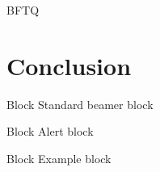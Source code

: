 \documentclass[french]{beamer}
\begin{document}
    \begin{frame}

        BFTQ

    \end{frame}

    \section{Conclusion}
    \begin{frame}
    \end{frame}

    \begin{frame}
        \begin{block}{Block}
            Standard beamer block
        \end{block}
        \begin{alertblock}{Block}
            Alert block
        \end{alertblock}
        \begin{exampleblock}{Block}
            Example block
        \end{exampleblock}
    \end{frame}

    \begin{frame}
        \printbibliography[heading=bibempty]

    \end{frame}
\end{document}
